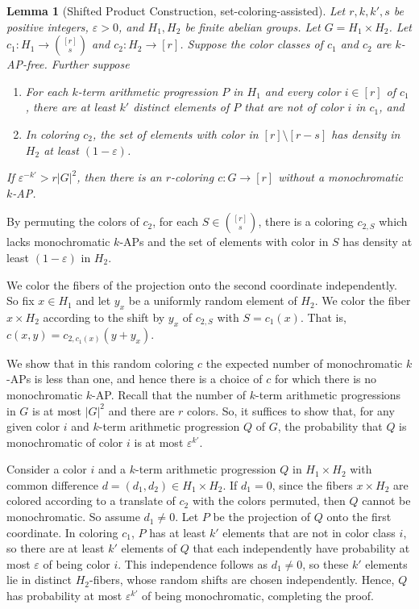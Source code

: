 \documentclass[11pt]{article}
\makeatletter
\numberwithin{equation}{section}
\renewenvironment{proof}[1][\proofname]{\par
  \vspace{-\topsep}%
  \pushQED{\qed}%
  \normalfont
  \topsep0pt \partopsep0pt %
  \trivlist
  \item[\hskip\labelsep
        \itshape
    #1\@addpunct{.}]\ignorespaces
}{%
  \popQED\endtrivlist\@endpefalse
  \addvspace{6pt plus 6pt} %
}
\newtheorem{lem}[result]{Lemma}
\theoremstyle{definition}
\theoremstyle{remark}
\makeatother
\begin{document}
\begin{lem}[Shifted Product Construction, set-coloring-assisted] \label{productlemma4} Let $r,k,k',s$ be positive integers, $\varepsilon>0$, and $H_1,H_2$ be finite abelian groups. Let $G=H_1 \times H_2$. Let $c_1: H_1 \rightarrow {[r] \choose s}$ and $c_2: H_2 \rightarrow [r]$. Suppose the color classes of $c_1$ and $c_2$ are $k$-AP-free. 
Further suppose
\begin{enumerate} 
\item For each $k$-term arithmetic progression $P$ in $H_1$ and every color $i \in [r]$ of $c_1$, there are at least $k'$ distinct elements of $P$ that are not of color $i$ in $c_1$, and   
\item In coloring $c_2$, the set of elements with color in $[r] \setminus [r-s]$ has density in $H_2$ at least $(1-\varepsilon)$. 
\end{enumerate}
If $\varepsilon^{-k'} > r|G|^2$, then there is an $r$-coloring $c:G \to [r]$ without a monochromatic $k$-AP. 
\end{lem}
\begin{proof}

By permuting the colors of $c_2$, for each $S \in {[r] \choose s}$, there is a coloring $c_{2,S}$ which lacks monochromatic $k$-APs and the set of elements with color in $S$ has density at least $(1-\varepsilon)$ in $H_2$. 

We color the fibers of the projection onto the second coordinate independently. So fix $x \in H_1$ and let $y_x$ be a uniformly random element of $H_2$. We color the fiber $x \times H_2$ according to the shift by $y_x$ of $c_{2,S}$ with $S=c_1(x)$. That is, $c(x,y) = c_{2,c_1(x)}(y+y_x)$. 

We show that in this random coloring $c$ the expected number of monochromatic $k$-APs is less than one, and hence there is a choice of $c$ for which there is no monochromatic $k$-AP. Recall that the number of $k$-term arithmetic progressions in $G$ is at most $|G|^2$ and there are $r$ colors. So, it suffices to show that, for any given color $i$ and $k$-term arithmetic progression $Q$ of $G$, the probability that $Q$ is monochromatic of color $i$ is at most $\varepsilon^{k'}$. 

Consider a color $i$ and a $k$-term arithmetic progression $Q$ in $H_1 \times H_2$ with common difference $d=(d_1,d_2) \in H_1 \times H_2$. If $d_1=0$, since the fibers $x \times H_2$ are colored according to a translate of $c_2$ with the colors permuted, then $Q$ cannot be monochromatic. So assume $d_1 \not = 0$. Let $P$ be the projection of $Q$ onto the first coordinate. In coloring $c_1$, $P$ has at least $k'$ elements that are not in color class $i$, so there are at least $k'$ elements of $Q$ that each independently have probability at most $\varepsilon$ of being color $i$. This independence follows as $d_1 \not = 0$, so these $k'$ elements lie in distinct $H_2$-fibers, whose random shifts are chosen independently. Hence, $Q$ has probability at most $\varepsilon^{k'}$ of being monochromatic, completing the proof. 
\end{proof}
\end{document}
